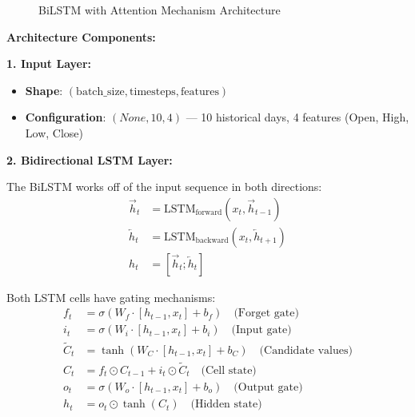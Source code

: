 \documentclass[12pt,a4paper]{article}
\begin{document}
\begin{figure}[htbp]
    \caption{BiLSTM with Attention Mechanism Architecture}
    \label{fig:bilstm_attention}
\end{figure}

\textbf{Architecture Components:}

\textbf{1. Input Layer:}
\begin{itemize}
    \item \textbf{Shape}: $(\text{batch\_size}, \text{timesteps}, \text{features})$
    \item \textbf{Configuration}: $(None, 10, 4)$ --- 10 historical days, 4 features (Open, High, Low, Close)
\end{itemize}

\textbf{2. Bidirectional LSTM Layer:}

The BiLSTM works off of the input sequence in both directions:
\begin{align}
\overrightarrow{h}_t &= \text{LSTM}_{\text{forward}}(x_t, \overrightarrow{h}_{t-1}) \\
\overleftarrow{h}_t &= \text{LSTM}_{\text{backward}}(x_t, \overleftarrow{h}_{t+1}) \\
h_t &= [\overrightarrow{h}_t; \overleftarrow{h}_t]
\end{align}

Both LSTM cells have gating mechanisms:
\begin{align}
f_t &= \sigma(W_f \cdot [h_{t-1}, x_t] + b_f) \quad \text{(Forget gate)} \\
i_t &= \sigma(W_i \cdot [h_{t-1}, x_t] + b_i) \quad \text{(Input gate)} \\
\tilde{C}_t &= \tanh(W_C \cdot [h_{t-1}, x_t] + b_C) \quad \text{(Candidate values)} \\
C_t &= f_t \odot C_{t-1} + i_t \odot \tilde{C}_t \quad \text{(Cell state)} \\
o_t &= \sigma(W_o \cdot [h_{t-1}, x_t] + b_o) \quad \text{(Output gate)} \\
h_t &= o_t \odot \tanh(C_t) \quad \text{(Hidden state)}
\end{align}
\end{document}
